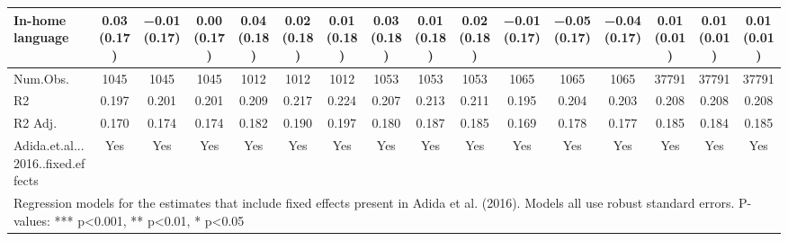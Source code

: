 \begin{table}[H]
\begin{tabular}[t]{lccccccccccccccc}
In-home language & \num{0.03} (\num{0.17}) & \num{-0.01} (\num{0.17}) & \num{0.00} (\num{0.17}) & \num{0.04} (\num{0.18}) & \num{0.02} (\num{0.18}) & \num{0.01} (\num{0.18}) & \num{0.03} (\num{0.18}) & \num{0.01} (\num{0.18}) & \num{0.02} (\num{0.18}) & \num{-0.01} (\num{0.17}) & \num{-0.05} (\num{0.17}) & \num{-0.04} (\num{0.17}) & \num{0.01} (\num{0.01}) & \num{0.01} (\num{0.01}) & \num{0.01} (\num{0.01})\\
\midrule
Num.Obs. & \num{1045} & \num{1045} & \num{1045} & \num{1012} & \num{1012} & \num{1012} & \num{1053} & \num{1053} & \num{1053} & \num{1065} & \num{1065} & \num{1065} & \num{37791} & \num{37791} & \num{37791}\\
R2 & \num{0.197} & \num{0.201} & \num{0.201} & \num{0.209} & \num{0.217} & \num{0.224} & \num{0.207} & \num{0.213} & \num{0.211} & \num{0.195} & \num{0.204} & \num{0.203} & \num{0.208} & \num{0.208} & \num{0.208}\\
R2 Adj. & \num{0.170} & \num{0.174} & \num{0.174} & \num{0.182} & \num{0.190} & \num{0.197} & \num{0.180} & \num{0.187} & \num{0.185} & \num{0.169} & \num{0.178} & \num{0.177} & \num{0.185} & \num{0.184} & \num{0.185}\\
Adida.et.al...2016..fixed.effects & Yes & Yes & Yes & Yes & Yes & Yes & Yes & Yes & Yes & Yes & Yes & Yes & Yes & Yes & Yes\\
\bottomrule
\multicolumn{16}{l}{\rule{0pt}{1em}Regression models for the estimates that include fixed effects present in Adida et al. (2016). Models all use robust standard errors. P-values: *** p<0.001, ** p<0.01, * p<0.05}\\
\end{tabular}
\end{table}
